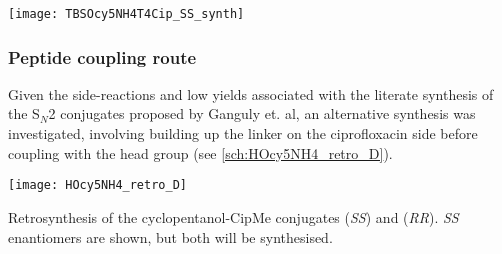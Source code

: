 \begin{scheme}[H]
	\begin{center}
		\texttt{[image: TBSOcy5NH4T4Cip\_SS\_synth]}
		\caption{
		a) , sodium ascorbate, THPTA, , \textit{t}-BuOH, r.t., 87.4 \%. %
		b) TBAF, THF, r.t., 16 h. %
		\label{sch:TBSOcy5NH4T4Cip_SS_synth}}
	\end{center}
\end{scheme}

\subsubsection{Peptide coupling route\label{sec:CipMe_linker}}

Given the side-reactions and low yields associated with the literate synthesis of the S$_N$2 conjugates proposed by Ganguly et. al\cite{Ganguly2011}, an alternative synthesis was investigated, involving building up the linker on the ciprofloxacin side before coupling with the head group (see \ref{sch:HOcy5NH4_retro_D}).


\begin{scheme}[H]
	\begin{center}
		\texttt{[image: HOcy5NH4\_retro\_D]}
		\caption{Retrosynthesis of the cyclopentanol-CipMe conjugates   (\textit{SS}) and  (\textit{RR}). \textit{SS} enantiomers are shown, but both will be synthesised.\label{sch:HOcy5NH4_retro_D}}
	\end{center}
\end{scheme}

